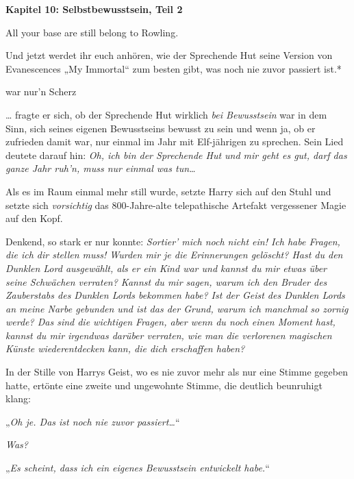 

\hypertarget{selbstbewusstsein-teil-2}{%

\textbf{Kapitel 10: Selbstbewusstsein, Teil 2}

All your base are still belong to Rowling.

\later

Und jetzt werdet ihr euch anhören, wie der Sprechende Hut seine Version von Evanescences „My Immortal“ zum besten gibt, was noch nie zuvor passiert ist.*

war nur'n Scherz

\later

… fragte er sich, ob der Sprechende Hut wirklich \emph{bei Bewusstsein} war in dem Sinn, sich seines eigenen Bewusstseins bewusst zu sein und wenn ja, ob er zufrieden damit war, nur einmal im Jahr mit Elf-jährigen zu sprechen. Sein Lied deutete darauf hin: \emph{Oh, ich bin der Sprechende Hut und mir geht es gut, darf das ganze Jahr ruh'n, muss nur einmal was tun…}

Als es im Raum einmal mehr still wurde, setzte Harry sich auf den Stuhl und setzte sich \emph{vorsichtig} das 800-Jahre-alte telepathische Artefakt vergessener Magie auf den Kopf.

Denkend, so stark er nur konnte: \emph{Sortier' mich noch nicht ein! Ich habe Fragen, die ich dir stellen muss! Wurden mir je die Erinnerungen gelöscht? Hast du den Dunklen Lord ausgewählt, als er ein Kind war und kannst du mir etwas über seine Schwächen verraten? Kannst du mir sagen, warum ich den Bruder des Zauberstabs des Dunklen Lords bekommen habe? Ist der Geist des Dunklen Lords an meine Narbe gebunden und ist das der Grund, warum ich manchmal so zornig werde? Das sind die wichtigen Fragen, aber wenn du noch einen Moment hast, kannst du mir irgendwas darüber verraten, wie man die verlorenen magischen Künste wiederentdecken kann, die dich erschaffen haben?}

In der Stille von Harrys Geist, wo es nie zuvor mehr als nur eine Stimme gegeben hatte, ertönte eine zweite und ungewohnte Stimme, die deutlich beunruhigt klang:

„\emph{Oh je. Das ist noch nie zuvor passiert…}“

\emph{Was?}

„\emph{Es scheint, dass ich ein eigenes Bewusstsein entwickelt habe.}“

}
